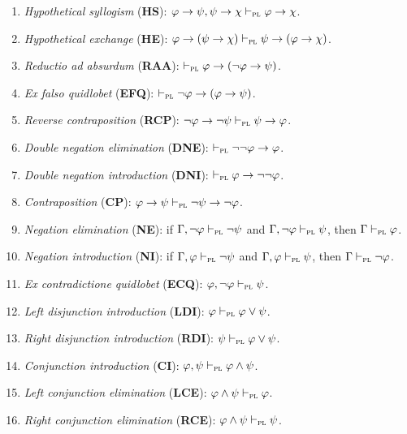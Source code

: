 \documentclass[a4paper, 11pt]{article} %
\begin{document}
\begin{enumerate}[itemsep=2pt]\small
	\item \textit{Hypothetical syllogism} (\textbf{HS}): $\varphi \rightarrow \psi, \psi \rightarrow \chi \vdash_{\textsc{pl}} \varphi \rightarrow \chi$.
	\item \textit{Hypothetical exchange} (\textbf{HE}): $\varphi \rightarrow (\psi \rightarrow \chi) \vdash_{\textsc{pl}} \psi \rightarrow (\varphi \rightarrow \chi)$.
	\item \textit{Reductio ad absurdum} (\textbf{RAA}): $\vdash_{\textsc{pl}} \varphi \rightarrow (\neg\varphi \rightarrow \psi)$.
	\item \textit{Ex falso quidlobet} (\textbf{EFQ}): $\vdash_{\textsc{pl}} \neg\varphi \rightarrow (\varphi \rightarrow \psi)$.

	\item \textit{Reverse contraposition} (\textbf{RCP}): $\neg\varphi \rightarrow \neg\psi \vdash_{\textsc{pl}} \psi \rightarrow \varphi$.
	\item \textit{Double negation elimination} (\textbf{DNE}): $\vdash_{\textsc{pl}} \neg\neg\varphi \rightarrow \varphi$.
	\item \textit{Double negation introduction} (\textbf{DNI}): $\vdash_{\textsc{pl}} \varphi \rightarrow \neg\neg\varphi$.
	\item \textit{Contraposition} (\textbf{CP}): $\varphi \rightarrow \psi \vdash_{\textsc{pl}} \neg\psi \rightarrow \neg\varphi$.
	\item \textit{Negation elimination} (\textbf{NE}): if $\Gamma, \neg\varphi \vdash_{\textsc{pl}} \neg\psi$ and $\Gamma, \neg\varphi \vdash_{\textsc{pl}} \psi$, then $\Gamma \vdash_{\textsc{pl}} \varphi$.
	\item \textit{Negation introduction} (\textbf{NI}): if $\Gamma, \varphi \vdash_{\textsc{pl}} \neg\psi$ and $\Gamma, \varphi \vdash_{\textsc{pl}} \psi$, then $\Gamma \vdash_{\textsc{pl}} \neg\varphi$.
	\item \textit{Ex contradictione quidlobet} (\textbf{ECQ}): $\varphi, \neg\varphi \vdash_{\textsc{pl}} \psi$.
	\item \textit{Left disjunction introduction} (\textbf{LDI}): $\varphi \vdash_{\textsc{pl}} \varphi \vee \psi$.
	\item \textit{Right disjunction introduction} (\textbf{RDI}): $\psi \vdash_{\textsc{pl}} \varphi \vee \psi$.
	\item \textit{Conjunction introduction} (\textbf{CI}): $\varphi, \psi \vdash_{\textsc{pl}} \varphi \wedge \psi$.
	\item \textit{Left conjunction elimination} (\textbf{LCE}): $\varphi \wedge \psi \vdash_{\textsc{pl}} \varphi$.
	\item \textit{Right conjunction elimination} (\textbf{RCE}): $\varphi \wedge \psi \vdash_{\textsc{pl}} \psi$.

\end{enumerate}
\end{document}
